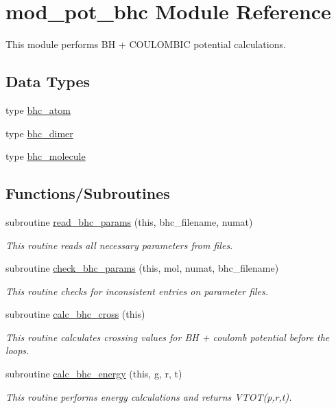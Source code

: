 \hypertarget{namespacemod__pot__bhc}{}\section{mod\+\_\+pot\+\_\+bhc Module Reference}
\label{namespacemod__pot__bhc}


This module performs BH + C\+O\+U\+L\+O\+M\+B\+IC potential calculations.  


\subsection*{Data Types}
\begin{DoxyCompactItemize}
\item 
type \hyperlink{structmod__pot__bhc_1_1bhc__atom}{bhc\+\_\+atom}
\item 
type \hyperlink{structmod__pot__bhc_1_1bhc__dimer}{bhc\+\_\+dimer}
\item 
type \hyperlink{structmod__pot__bhc_1_1bhc__molecule}{bhc\+\_\+molecule}
\end{DoxyCompactItemize}
\subsection*{Functions/\+Subroutines}
\begin{DoxyCompactItemize}
\item 
subroutine \hyperlink{namespacemod__pot__bhc_ab1ca15618078c0662d799fc22b126e17}{read\+\_\+bhc\+\_\+params} (this, bhc\+\_\+filename, numat)
\begin{DoxyCompactList}\small\item\em This routine reads all necessary parameters from files. \end{DoxyCompactList}\item 
subroutine \hyperlink{namespacemod__pot__bhc_a4fe10c812421f1de0a51b6fa227fcfd9}{check\+\_\+bhc\+\_\+params} (this, mol, numat, bhc\+\_\+filename)
\begin{DoxyCompactList}\small\item\em This routine checks for inconsistent entries on parameter files. \end{DoxyCompactList}\item 
subroutine \hyperlink{namespacemod__pot__bhc_af0819f829c162a751bfd89f7985103dc}{calc\+\_\+bhc\+\_\+cross} (this)
\begin{DoxyCompactList}\small\item\em This routine calculates crossing values for BH + coulomb potential before the loops. \end{DoxyCompactList}\item 
subroutine \hyperlink{namespacemod__pot__bhc_a4053339b84bceb793c404010f7735624}{calc\+\_\+bhc\+\_\+energy} (this, g, r, t)
\begin{DoxyCompactList}\small\item\em This routine performs energy calculations and returns V\+T\+O\+T(p,r,t). \end{DoxyCompactList}\end{DoxyCompactItemize}
